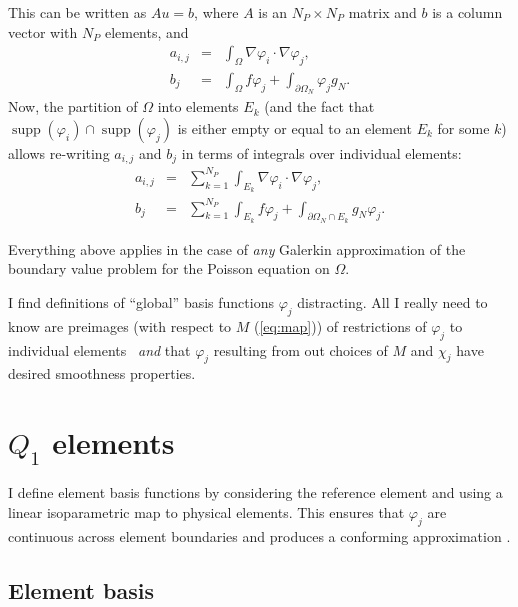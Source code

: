 \documentclass{article}
\newcommand{\tmop}[1]{\ensuremath{\operatorname{#1}}}
{ \theorembodyfont{\upshape} \newtheorem{note}{Note} }
{ \theorembodyfont{\upshape} \newtheorem{remark}{Remark} }
\begin{document}
This can be written as $A u = b$, where $A$ is an $N_P \times N_P$ matrix and
$b$ is a column vector with $N_P$ elements, and
\begin{eqnarray*}
  a_{i, j} & = & \int_{\Omega} \nabla \varphi_i \cdot \nabla \varphi_j,\\
  b_j & = & \int_{\Omega} f \varphi_j + \int_{\partial \Omega_N} \varphi_j g_N
  .
\end{eqnarray*}
Now, the partition of $\Omega$ into elements $E_k$ (and the fact that
$\tmop{supp} (\varphi_i) \cap \tmop{supp} (\varphi_j)$ is either empty or
equal to an element $E_k$ for some $k$) allows re-writing $a_{i, j}$ and $b_j$
in terms of integrals over individual elements:
\begin{eqnarray}
  a_{i, j} & = & \sum_{k = 1}^{N_P} \int_{E_k} \nabla \varphi_i \cdot \nabla
  \varphi_j,  \label{eq:matrix}\\
  b_j & = & \sum_{k = 1}^{N_P} \int_{E_k} f \varphi_j + \int_{\partial
  \Omega_N \cap E_k} g_N \varphi_j .  \label{eq:rhs}
\end{eqnarray}
\begin{note}
  Everything above applies in the case of \emph{any} Galerkin approximation
  of the boundary value problem for the Poisson equation on $\Omega$.
\end{note}

\begin{remark}
  I find definitions of ``global'' basis functions $\varphi_j$ distracting.
  All I really need to know are preimages (with respect to $M$
  (\ref{eq:map})) of restrictions of $\varphi_j$ to individual elements \
  \emph{and} that $\varphi_j$ resulting from out choices of $M$ and $\chi_j$
  have desired smoothness properties.
\end{remark}

\section{$Q_1$ elements}

I define element basis functions by considering the reference element and using
a linear isoparametric map to physical elements. This ensures that
$\varphi_j$ are continuous across element boundaries and produces a conforming
approximation \cite[section 1.3.4]{Elmanetal2005}.

\subsection{Element basis}\label{sec:elementbasis}
\end{document}
